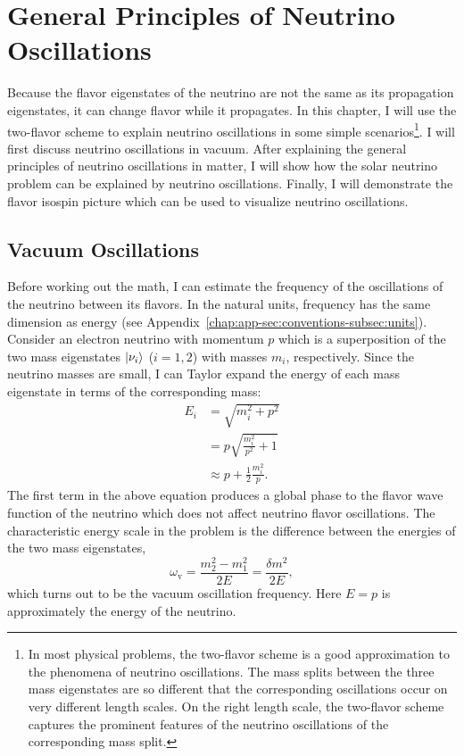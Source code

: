

\chapter{\label{chap:basics}General Principles of Neutrino Oscillations}

Because the flavor eigenstates of the neutrino are not the same as its propagation eigenstates, it can change flavor while it propagates.
In this chapter, I will use the two-flavor scheme to explain neutrino oscillations in some simple scenarios\footnote{In most physical problems, the two-flavor scheme is a good approximation to the phenomena of neutrino oscillations. The mass splits between the three mass eigenstates are so different that the corresponding oscillations occur on very different length scales. On the right length scale, the two-flavor scheme captures the prominent features of the neutrino oscillations of the corresponding mass split.}.
I will first discuss neutrino oscillations in vacuum. After explaining the general principles of neutrino oscillations in matter, I will show how the solar neutrino problem can be explained by neutrino oscillations. Finally, I will demonstrate the flavor isospin picture which can be used to visualize neutrino oscillations.


\section{\label{chap:basics-sec:vacuum-oscillations}Vacuum Oscillations}

Before working out the math, I can estimate the frequency of the oscillations of the neutrino between its flavors. In the natural units, frequency has the same dimension as energy (see Appendix~\ref{chap:app-sec:conventions-subsec:units}). Consider an electron neutrino with momentum $p$ which is a superposition of the two mass eigenstates $\left| \nu_i\right\rangle$ ($i=1,2$) with masses $m_i$, respectively. Since the neutrino masses are small, I can Taylor expand the energy of each mass eigenstate in terms of the corresponding mass:
\begin{align}
E_i & = \sqrt{m_i^2 + p^2 } \nonumber\\
& = p \sqrt{\frac{m_i^2}{p^2} + 1} \nonumber\\
& \approx p + \frac{1}{2} \frac{m_i^2}{p}.
\label{chap:basics-section:neutrinos-eqn:energy-taylor}
\end{align}
The first term in the above equation produces a global phase to the flavor wave function of the neutrino which does not affect neutrino flavor oscillations. The characteristic energy scale in the problem is the difference between the energies of the two mass eigenstates,
\begin{equation}
    \omega_{\mathrm v} =  \frac{m_2^2-m_1^2}{2E} = \frac{\delta m^2}{2E},
    \label{chap:basics-section:neutrinos-eqn:qualitative-method-frequency}
\end{equation}
which turns out to be the vacuum oscillation frequency. Here $E=p$ is approximately the energy of the neutrino.

